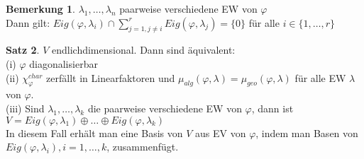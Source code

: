 \documentclass[10pt,a4paper,numbers=endperiod]{scrartcl}
\theoremstyle{definition}
\newtheorem{satz}{Satz}[section]
\newtheorem{bem}[satz]{Bemerkung}
\begin{document}
\begin{bem}
	$\lambda_1, \ldots, \lambda_n$ paarweise verschiedene EW von $\varphi$\\
	Dann gilt: $Eig(\varphi, \lambda_i) \cap \sum\limits_{j = 1, j \neq i}^r Eig(\varphi, \lambda_j) = \{0\}$ für alle $i \in \{1,\ldots, r\}$
\end{bem}

\begin{satz}
	$V$ endlichdimensional. Dann sind äquivalent:\\
	(i) $\varphi$ diagonalisierbar\\
	(ii) $\chi_{\varphi}^{char}$ zerfällt in Linearfaktoren und $\mu_{alg}(\varphi, \lambda) = \mu_{geo}(\varphi, \lambda)$ für alle EW $\lambda$ von $\varphi$.\\
	(iii) Sind $\lambda_1, \ldots, \lambda_k$ die paarweise verschiedene EW von $\varphi$, dann ist $V = Eig(\varphi, \lambda_1) \oplus \ldots \oplus Eig(\varphi, \lambda_k)$\\
	In diesem Fall erhält man eine Basis von $V$ aus EV von $\varphi$, indem man Basen von $Eig(\varphi, \lambda_i), i = 1,\ldots,k$, zusammenfügt.
\end{satz}
\end{document}
